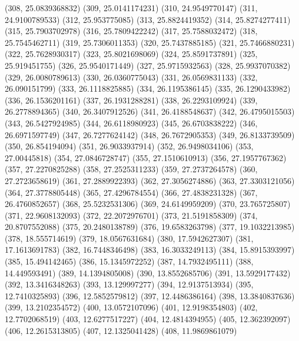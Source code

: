 {					(308, 25.0839368832)
					(309, 25.0141174231)
					(310, 24.9549770147)
					(311, 24.9100789533)
					(312, 25.953775085)
					(313, 25.8824419352)
					(314, 25.8274277411)
					(315, 25.7903702978)
					(316, 25.7809422242)
					(317, 25.7588032472)
					(318, 25.7545462711)
					(319, 25.7306011353)
					(320, 25.7437885185)
					(321, 25.7466880231)
					(322, 25.7628930317)
					(323, 25.8021698069)
					(324, 25.8591737891)
					(325, 25.919451755)
					(326, 25.9540171449)
					(327, 25.9715932563)
					(328, 25.9937070382)
					(329, 26.0080789613)
					(330, 26.0360775043)
					(331, 26.0569831133)
					(332, 26.090151799)
					(333, 26.1118825885)
					(334, 26.1195386145)
					(335, 26.1290433982)
					(336, 26.1536201161)
					(337, 26.1931288281)
					(338, 26.2293109924)
					(339, 26.2778894365)
					(340, 26.3407912526)
					(341, 26.4188548637)
					(342, 26.4795015503)
					(343, 26.5427924985)
					(344, 26.6118980923)
					(345, 26.6703838222)
					(346, 26.6971597749)
					(347, 26.7277624142)
					(348, 26.7672905353)
					(349, 26.8133739509)
					(350, 26.854194094)
					(351, 26.9033937914)
					(352, 26.9498034106)
					(353, 27.00445818)
					(354, 27.0846728747)
					(355, 27.1510610913)
					(356, 27.1957767362)
					(357, 27.2270825288)
					(358, 27.2525311233)
					(359, 27.2737264578)
					(360, 27.2723658619)
					(361, 27.2889922393)
					(362, 27.3056274886)
					(363, 27.3303121056)
					(364, 27.3778805448)
					(365, 27.4296784554)
					(366, 27.4838231328)
					(367, 26.4760852657)
					(368, 25.5232531306)
					(369, 24.6149959209)
					(370, 23.765725807)
					(371, 22.9608132093)
					(372, 22.2072976701)
					(373, 21.5191858309)
					(374, 20.8707552088)
					(375, 20.2480138789)
					(376, 19.6583263798)
					(377, 19.1032213985)
					(378, 18.555714619)
					(379, 18.0567631684)
					(380, 17.5942627307)
					(381, 17.1613691783)
					(382, 16.7448346498)
					(383, 16.3033249113)
					(384, 15.8915393997)
					(385, 15.494142465)
					(386, 15.1345972252)
					(387, 14.7932495111)
					(388, 14.449593491)
					(389, 14.1394805008)
					(390, 13.8552685706)
					(391, 13.5929177432)
					(392, 13.3416348263)
					(393, 13.129997277)
					(394, 12.9137513934)
					(395, 12.7410325893)
					(396, 12.5852579812)
					(397, 12.4486386164)
					(398, 13.3840837636)
					(399, 13.2102354572)
					(400, 13.0572107096)
					(401, 12.9198354803)
					(402, 12.7702068519)
					(403, 12.6277517227)
					(404, 12.4814394955)
					(405, 12.362392097)
					(406, 12.2615313805)
					(407, 12.1325041428)
					(408, 11.9869861079)
}
